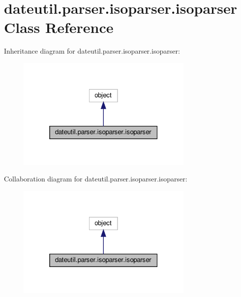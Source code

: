\hypertarget{classdateutil_1_1parser_1_1isoparser_1_1isoparser}{}\section{dateutil.\+parser.\+isoparser.\+isoparser Class Reference}
\label{classdateutil_1_1parser_1_1isoparser_1_1isoparser}


Inheritance diagram for dateutil.\+parser.\+isoparser.\+isoparser\+:
\nopagebreak
\begin{figure}[H]
\begin{center}
\leavevmode
\includegraphics[width=244pt]{classdateutil_1_1parser_1_1isoparser_1_1isoparser__inherit__graph}
\end{center}
\end{figure}


Collaboration diagram for dateutil.\+parser.\+isoparser.\+isoparser\+:
\nopagebreak
\begin{figure}[H]
\begin{center}
\leavevmode
\includegraphics[width=244pt]{classdateutil_1_1parser_1_1isoparser_1_1isoparser__coll__graph}
\end{center}
\end{figure}

